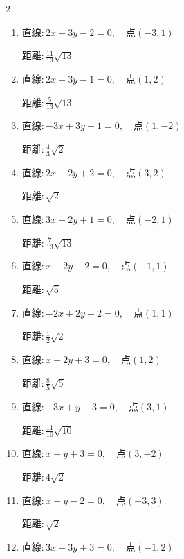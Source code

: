\begin{multicols}{2}
\begin{enumerate}
        $\displaystyle 距離 : 0$

  \item $直線:2x-3y-2=0,\quad 点 ( -3, 1 )$

        $\displaystyle 距離 : \frac{11}{13}\sqrt{13}$

  \item $直線:2x-3y-1=0,\quad 点 ( 1, 2 )$

        $\displaystyle 距離 : \frac{5}{13}\sqrt{13}$

\columnbreak %

  \item $直線:-3x+3y+1=0,\quad 点 ( 1, -2 )$

        $\displaystyle 距離 : \frac{4}{3}\sqrt{2}$

  \item $直線:2x-2y+2=0,\quad 点 ( 3, 2 )$

        $\displaystyle 距離 : \sqrt{2}$

  \item $直線:3x-2y+1=0,\quad 点 ( -2, 1 )$

        $\displaystyle 距離 : \frac{7}{13}\sqrt{13}$

  \item $直線:x-2y-2=0,\quad 点 ( -1, 1 )$

        $\displaystyle 距離 : \sqrt{5}$

  \item $直線:-2x+2y-2=0,\quad 点 ( 1, 1 )$

        $\displaystyle 距離 : \frac{1}{2}\sqrt{2}$

  \item $直線:x+2y+3=0,\quad 点 ( 1, 2 )$

        $\displaystyle 距離 : \frac{8}{5}\sqrt{5}$

  \item $直線:-3x+y-3=0,\quad 点 ( 3, 1 )$

        $\displaystyle 距離 : \frac{11}{10}\sqrt{10}$

  \item $直線:x-y+3=0,\quad 点 ( 3, -2 )$

        $\displaystyle 距離 : 4\sqrt{2}$

  \item $直線:x+y-2=0,\quad 点 ( -3, 3 )$

        $\displaystyle 距離 : \sqrt{2}$

  \item $直線:3x-3y+3=0,\quad 点 ( -1, 2 )$


\end{enumerate}
\end{multicols}
